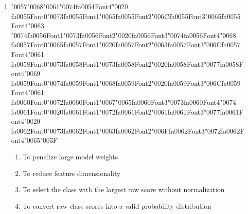 \documentclass[12pt]{article}
\begin{document}
\begin{enumerate}[label=Q\arabic*.]
\item {\char"0057}{\char"0068}{\char"0061}{\char"0074}{\csname fa0054Font4\endcsname\char"0020} {\csname fa0055Font0\endcsname\char"0073}{\csname fa0055Font1\endcsname\char"0065}{\csname fa0055Font2\endcsname\char"006C}{\csname fa0055Font3\endcsname\char"0065}{\csname fa0055Font4\endcsname\char"0063} {\char"0074}{\csname fa0056Font1\endcsname\char"0073}{\csname fa0056Font2\endcsname\char"0020}{\csname fa0056Font3\endcsname\char"0074}{\csname fa0056Font4\endcsname\char"0068} {\csname fa0057Font0\endcsname\char"0065}{\csname fa0057Font1\endcsname\char"0020}{\csname fa0057Font2\endcsname\char"0063}{\csname fa0057Font3\endcsname\char"006C}{\csname fa0057Font4\endcsname\char"0061} {\csname fa0058Font0\endcsname\char"0073}{\csname fa0058Font1\endcsname\char"0073}{\csname fa0058Font2\endcsname\char"0020}{\csname fa0058Font3\endcsname\char"0077}{\csname fa0058Font4\endcsname\char"0069} {\csname fa0059Font0\endcsname\char"0074}{\csname fa0059Font1\endcsname\char"0068}{\csname fa0059Font2\endcsname\char"0020}{\csname fa0059Font3\endcsname\char"006C}{\csname fa0059Font4\endcsname\char"0061} {\csname fa0060Font0\endcsname\char"0072}{\csname fa0060Font1\endcsname\char"0067}{\char"0065}{\csname fa0060Font3\endcsname\char"0073}{\csname fa0060Font4\endcsname\char"0074} {\csname fa0061Font0\endcsname\char"0020}{\csname fa0061Font1\endcsname\char"0072}{\csname fa0061Font2\endcsname\char"0061}{\csname fa0061Font3\endcsname\char"0077}{\csname fa0061Font4\endcsname\char"0020} {\csname fa0062Font0\endcsname\char"0073}{\csname fa0062Font1\endcsname\char"0063}{\csname fa0062Font2\endcsname\char"006F}{\csname fa0062Font3\endcsname\char"0072}{\csname fa0062Font4\endcsname\char"0065}{\char"003F}
\begin{enumerate}[label=(\Alph*)]
    \item To penalize large model weights
    \item To reduce feature dimensionality
    \item To select the class with the largest raw score without normalization
    \item To convert raw class scores into a valid probability distribution
\end{enumerate}

\end{enumerate}
\end{document}

